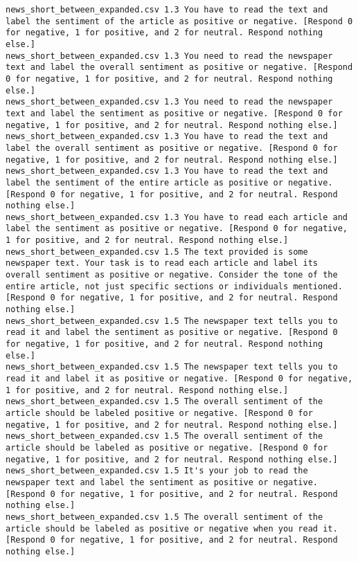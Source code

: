 \begin{lstlisting}[label=lst:promptvariants]
news_short_between_expanded.csv	1.3	You have to read the text and label the sentiment of the article as positive or negative. [Respond 0 for negative, 1 for positive, and 2 for neutral. Respond nothing else.]
news_short_between_expanded.csv	1.3	You need to read the newspaper text and label the overall sentiment as positive or negative. [Respond 0 for negative, 1 for positive, and 2 for neutral. Respond nothing else.]
news_short_between_expanded.csv	1.3	You need to read the newspaper text and label the sentiment as positive or negative. [Respond 0 for negative, 1 for positive, and 2 for neutral. Respond nothing else.]
news_short_between_expanded.csv	1.3	You have to read the text and label the overall sentiment as positive or negative. [Respond 0 for negative, 1 for positive, and 2 for neutral. Respond nothing else.]
news_short_between_expanded.csv	1.3	You have to read the text and label the sentiment of the entire article as positive or negative. [Respond 0 for negative, 1 for positive, and 2 for neutral. Respond nothing else.]
news_short_between_expanded.csv	1.3	You have to read each article and label the sentiment as positive or negative. [Respond 0 for negative, 1 for positive, and 2 for neutral. Respond nothing else.]
news_short_between_expanded.csv	1.5	The text provided is some newspaper text. Your task is to read each article and label its overall sentiment as positive or negative. Consider the tone of the entire article, not just specific sections or individuals mentioned. [Respond 0 for negative, 1 for positive, and 2 for neutral. Respond nothing else.]
news_short_between_expanded.csv	1.5	The newspaper text tells you to read it and label the sentiment as positive or negative. [Respond 0 for negative, 1 for positive, and 2 for neutral. Respond nothing else.]
news_short_between_expanded.csv	1.5	The newspaper text tells you to read it and label it as positive or negative. [Respond 0 for negative, 1 for positive, and 2 for neutral. Respond nothing else.]
news_short_between_expanded.csv	1.5	The overall sentiment of the article should be labeled positive or negative. [Respond 0 for negative, 1 for positive, and 2 for neutral. Respond nothing else.]
news_short_between_expanded.csv	1.5	The overall sentiment of the article should be labeled as positive or negative. [Respond 0 for negative, 1 for positive, and 2 for neutral. Respond nothing else.]
news_short_between_expanded.csv	1.5	It's your job to read the newspaper text and label the sentiment as positive or negative. [Respond 0 for negative, 1 for positive, and 2 for neutral. Respond nothing else.]
news_short_between_expanded.csv	1.5	The overall sentiment of the article should be labeled as positive or negative when you read it. [Respond 0 for negative, 1 for positive, and 2 for neutral. Respond nothing else.]

\end{lstlisting}
